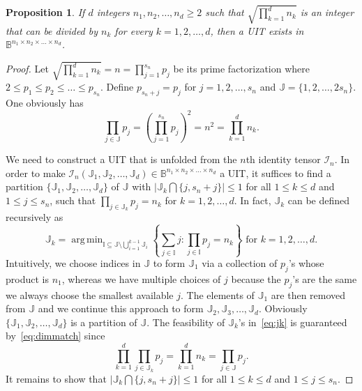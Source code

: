 \documentclass[11pt]{article}
\newtheorem{proposition}[theorem]{Proposition}
\DeclareMathOperator*{\argmin}{arg\,min}
\newcommand{\BB}{\mathbb{B}}
\newcommand{\Q}{\mathbb{Q}}
\newcommand{\BP}{\mathbb{P}}
\newcommand{\BI}{\mathbb{I}}
\newcommand{\BJ}{\mathbb{J}}
\newcommand{\II}{\mathcal{I}}
\begin{document}
\begin{proposition}
If $d$ integers $n_1,n_2,\dots,n_d\ge2$ such that $\sqrt{\prod_{k=1}^dn_k}$ is an integer that can be divided by $n_k$ for every $k=1,2,\dots,d$, then a UIT exists in $\BB^{n_1\times n_2\times \dots \times n_d}$.
\end{proposition}
\begin{proof}
Let $\sqrt{\prod_{k=1}^dn_k}=n=\prod_{j=1}^{s_n} p_j$ be its prime factorization where $2\le p_1\le p_2\le \dots \le p_{s_n}$. Define $p_{s_n+j}=p_{j}$ for $j=1,2,\dots,s_n$ and $\BJ=\{1,2,\dots,2s_n\}$. One obviously has \begin{equation}
    \prod_{j\in\BJ}p_j=\left(\prod_{j=1}^{s_n} p_j\right)^2=n^2=\prod_{k=1}^dn_k.\label{eq:dimmatch}
\end{equation}

We need to construct a UIT that is unfolded from the $n$th identity tensor $\II_n$. In order to make $\II_n(\BJ_1,\BJ_2,\dots,\BJ_d)\in\BB^{n_1\times n_2\times \dots \times n_d}$ a UIT, it suffices to find a partition $\{\BJ_1,\BJ_2,\dots,\BJ_d\}$ of $\BJ$ with $\left|\BJ_k\bigcap\{j,s_n+j\}\right|\le1$ for all $1\le k\le d$ and $1\le j\le s_n$, such that $\prod_{j\in\BJ_k}p_j=n_k$ for $k=1,2,\dots,d$. In fact, $\BJ_k$ can be defined recursively as
\begin{equation} \label{eq:jk}
\BJ_k = \argmin_{\BI \subseteq \BJ \setminus \bigcup_{i=1}^{k-1}\BJ_i} \left\{ \sum_{j\in\BI} j: \prod_{j\in\BI}p_j=n_k \right\} \mbox{ for } k=1,2,\dots,d.
\end{equation}
Intuitively, we choose indices in $\BJ$ to form $\BJ_1$ via a collection of $p_j$'s whose product is $n_1$, whereas we have multiple choices of $j$ because the $p_j$'s are the same we always choose the smallest available $j$. The elements of $\BJ_1$ are then removed from $\BJ$ and we continue this approach to form $\BJ_2, \BJ_3, \dots, \BJ_d$. Obviously $\{\BJ_1,\BJ_2,\dots,\BJ_d\}$ is a partition of $\BJ$. The feasibility of $\BJ_k$'s in~\eqref{eq:jk} is guaranteed by~\eqref{eq:dimmatch} since
$$
\prod_{k=1}^d \prod_{j\in\BJ_k}p_j = \prod_{k=1}^dn_k = \prod_{j\in\BJ}p_j.
$$
It remains to show that $\left|\BJ_k\bigcap\{j,s_n+j\}\right|\le1$ for all $1\le k\le d$ and $1\le j\le s_n$.


\end{proof}
\end{document}
